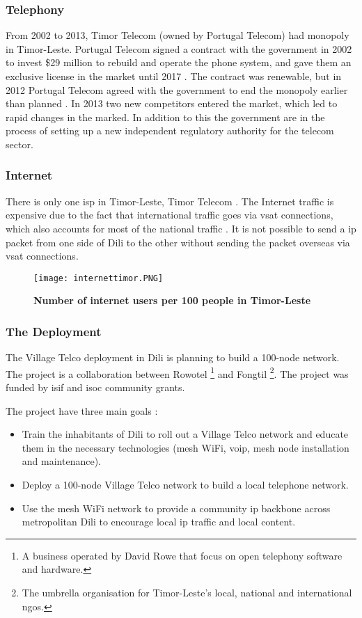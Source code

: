\subsubsection{Telephony}
From 2002 to 2013, Timor Telecom (owned by Portugal Telecom) had monopoly in Timor-Leste. Portugal Telecom signed a contract with the government in 2002 to invest \$29 million to rebuild and operate the phone system, and gave them an exclusive license in the market until 2017 \cite{wikitelecomeasttimor}. The contract was renewable, but in 2012 Portugal Telecom agreed with the government to end the monopoly earlier than planned \cite{budde}. In 2013 two new competitors entered the market, which led to rapid changes in the marked. In addition to this the government are in the process of setting up a new independent regulatory authority for the telecom sector. 

\subsubsection{Internet} There is only one \gls{isp} in Timor-Leste, Timor Telecom \cite{wikitelecomeasttimor}. The Internet traffic is expensive due to the fact that international traffic goes via \gls{vsat} connections, which also accounts for most of the national traffic \cite{vtdili}. It is not possible to send a \gls{ip} packet from one side of Dili to the other without sending the packet overseas via \gls{vsat} connections. 


\begin{figure}[t]
\centering
\texttt{[image: internettimor.PNG]}
\caption[Number of internet users per 100 people in Timor-Leste]{\textbf{Number of internet users per 100 people in Timor-Leste}}
\label{fig:internettimor}
\end{figure}

\subsubsection{The Deployment}
The Village Telco deployment in Dili is planning to build a 100-node network. The project is a collaboration between Rowotel \footnote{A business operated by David Rowe that focus on open telephony software and hardware.} and Fongtil \footnote{The umbrella organisation for Timor-Leste’s local, national and international \glspl{ngo}.}. The project was funded by \gls{isif} and \gls{isoc} community grants. 

The project have three main goals \cite{vtdili}:
\begin{itemize}
\item Train the inhabitants of Dili to roll out a Village Telco network and educate them in the necessary technologies (mesh WiFi, \gls{voip}, mesh node installation and maintenance).
\item Deploy a 100-node Village Telco network to build a local telephone network.
\item Use the mesh WiFi network to provide a community \gls{ip} backbone across metropolitan Dili to encourage local \gls{ip} traffic and local content.
\end{itemize}

